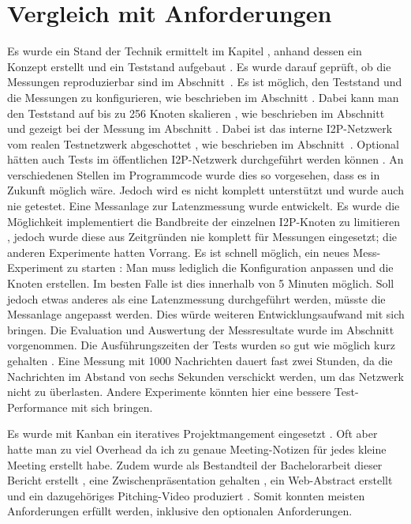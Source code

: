\section{Vergleich mit Anforderungen}\label{sec:vergleich_anforderungen}

Es wurde ein Stand der Technik ermittelt  im Kapitel , anhand dessen ein Konzept  erstellt und ein Teststand aufgebaut .
Es wurde darauf geprüft, ob die Messungen reproduzierbar sind  im Abschnitt~.
Es ist möglich, den Teststand und die Messungen zu konfigurieren, wie beschrieben im Abschnitt  .
Dabei kann man den Teststand auf bis zu 256 Knoten skalieren ,
wie beschrieben im Abschnitt  und gezeigt bei der Messung im Abschnitt .
Dabei ist das interne I2P-Netzwerk vom realen Testnetzwerk abgeschottet , wie beschrieben im Abschnitt~.
Optional hätten auch Tests im öffentlichen I2P-Netzwerk durchgeführt werden können .
An verschiedenen Stellen im Programmcode wurde dies so vorgesehen, dass es in Zukunft möglich wäre.
Jedoch wird es nicht komplett unterstützt und wurde auch nie getestet.
Eine Messanlage zur Latenzmessung  wurde entwickelt.
Es wurde die Möglichkeit implementiert die Bandbreite der einzelnen I2P-Knoten zu limitieren , jedoch wurde diese aus Zeitgründen nie komplett für Messungen eingesetzt; die anderen Experimente hatten Vorrang.
Es ist schnell möglich, ein neues Mess-Experiment zu starten : Man muss lediglich die Konfiguration anpassen und die Knoten erstellen.
Im besten Falle ist dies innerhalb von 5 Minuten möglich.
Soll jedoch etwas anderes als eine Latenzmessung durchgeführt werden, müsste die Messanlage angepasst werden.
Dies würde weiteren Entwicklungsaufwand mit sich bringen.
Die Evaluation und Auswertung der Messresultate  wurde im Abschnitt  vorgenommen.
Die Ausführungszeiten der Tests wurden so gut wie möglich kurz gehalten . Eine Messung mit 1000 Nachrichten dauert fast zwei Stunden, da die Nachrichten im Abstand von sechs Sekunden verschickt werden, um das Netzwerk nicht zu überlasten. Andere Experimente könnten hier eine bessere Test-Performance mit sich bringen.

Es wurde mit Kanban ein iteratives Projektmangement eingesetzt .
Oft aber hatte man zu viel Overhead da ich zu genaue Meeting-Notizen für jedes kleine Meeting erstellt habe.
Zudem wurde als Bestandteil der Bachelorarbeit dieser Bericht erstellt , eine Zwischenpräsentation gehalten , ein Web-Abstract erstellt  und ein dazugehöriges Pitching-Video produziert .
Somit konnten meisten Anforderungen erfüllt werden, inklusive den optionalen Anforderungen.

